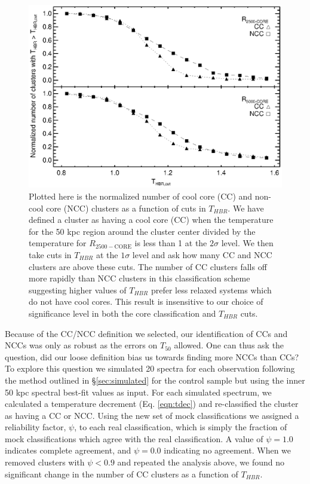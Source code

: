 \documentclass[12pt,preprint]{aastex}
\begin{document}
\begin{figure}
\begin{center}
\includegraphics*[width=\textwidth, trim=15mm 10mm 0mm 0mm, clip]{f5.eps}
\caption{
Plotted here is the normalized number of cool core (CC) and non-cool core
(NCC) clusters as a function of cuts in $T_{HBR}$. We have defined a
cluster as having a cool core (CC) when the temperature for the 50 kpc
region around the cluster center divided by the temperature for
$R_{2500-\mathrm{CORE}}$ is less than 1 at the $2\sigma$ level. We then
take cuts in $T_{HBR}$ at the $1\sigma$ level and ask how many CC and
NCC clusters are above these cuts. The number of CC clusters falls off
more rapidly than NCC clusters in this classification scheme
suggesting higher values of $T_{HBR}$ prefer less relaxed systems
which do not have cool cores. This result is insensitive to our choice
of significance level in both the core classification and $T_{HBR}$
cuts.
}
\label{fig:cc_ncc_bin}
\end{center}
\end{figure}

Because of the CC/NCC definition we selected, our identification of
CCs and NCCs was only as robust as the errors on $T_{50}$ allowed. One can
thus ask the question, did our loose definition bias us towards
finding more NCCs than CCs? To explore this question we simulated 20
spectra for each observation following the method outlined in
\S\ref{sec:simulated} for the control sample but using the inner 50
kpc spectral best-fit values as input. For each simulated spectrum, we
calculated a temperature decrement (Eq. \ref{eqn:tdec}) and
re-classified the cluster as having a CC or NCC. Using the new set of
mock classifications we assigned a reliability factor, $\psi$, to each
real classification, which is simply the fraction of mock
classifications which agree with the real classification. A value of
$\psi = 1.0$ indicates complete agreement, and $\psi = 0.0$ indicating no
agreement. When we removed clusters with $\psi < 0.9$ and repeated the
analysis above, we found no significant change in the number of CC
clusters as a function of $T_{HBR}$.
\end{document}
